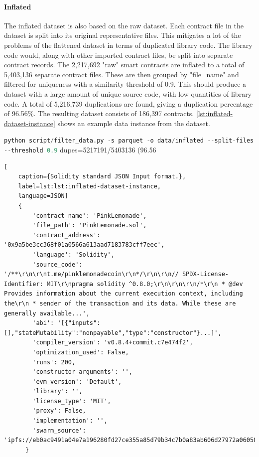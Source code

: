 \paragraph{Inflated}
\label{sec:verified-smart-contracts-inflated}
The inflated dataset is also based on the raw dataset. Each contract file in the dataset is split into its original representative files. This mitigates a lot of the problems of the flattened dataset in terms of duplicated library code. The library code would, along with other imported contract files, be split into separate contract records. The 2,217,692 "raw" smart contracts are inflated to a total of 5,403,136 separate contract files. These are then grouped by "file\_name" and filtered for uniqueness with a similarity threshold of 0.9. This should produce a dataset with a large amount of unique source code, with low quantities of library code. A total of 5,216,739 duplications are found, giving a duplication percentage of 96.56\%. The resulting dataset consists of 186,397 contracts. \cref{lst:inflated-dataset-instance} shows an example data instance from the dataset.



\lstinline[language=Python]!python script/filter_data.py -s parquet -o data/inflated --split-files --threshold 0.9!
dupes=5217191/5403136 (96.56%


\begin{lstlisting}[
    caption={Solidity standard JSON Input format.},
    label=lst:lst:inflated-dataset-instance,
    language=JSON]
    {
        'contract_name': 'PinkLemonade',
        'file_path': 'PinkLemonade.sol',
        'contract_address': '0x9a5be3cc368f01a0566a613aad7183783cff7eec',
        'language': 'Solidity',
        'source_code': '/**\r\n\r\nt.me/pinklemonadecoin\r\n*/\r\n\r\n// SPDX-License-Identifier: MIT\r\npragma solidity ^0.8.0;\r\n\r\n\r\n/*\r\n * @dev Provides information about the current execution context, including the\r\n * sender of the transaction and its data. While these are generally available...',
        'abi': '[{"inputs":[],"stateMutability":"nonpayable","type":"constructor"}...]',
        'compiler_version': 'v0.8.4+commit.c7e474f2',
        'optimization_used': False,
        'runs': 200,
        'constructor_arguments': '',
        'evm_version': 'Default',
        'library': '',
        'license_type': 'MIT',
        'proxy': False,
        'implementation': '',
        'swarm_source': 'ipfs://eb0ac9491a04e7a196280fd27ce355a85d79b34c7b0a83ab606d27972a06050c'
      }
      
      
\end{lstlisting}



